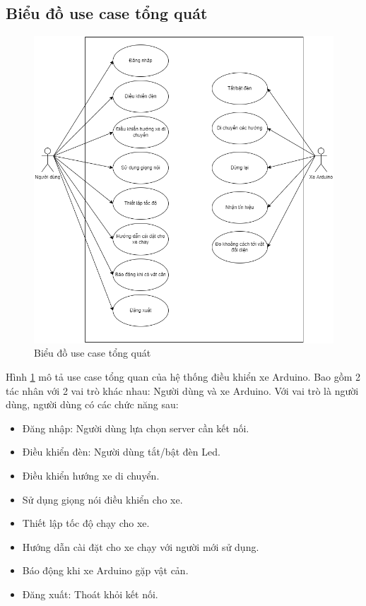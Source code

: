 \documentclass[../DoAn.tex]{subfiles}
\begin{document}
\subsection{Biểu đồ use case tổng quát}
\label{subsection:2.2.1}
\begin{figure}[H]
    \includegraphics[scale = 0.6]{Hinhve/usecase_tong_quan.png}
    \centering
    \caption{Biểu đồ use case tổng quát}
    \label{fig:2.2.1}
\end{figure}

Hình \ref{fig:2.2.1} mô tả use case tổng quan của hệ thống điều khiển xe Arduino. Bao gồm 2 tác nhân với 2 vai trò khác nhau: Người dùng và xe Arduino. Với vai trò là người dùng, người dùng có các chức năng sau:
\begin{itemize}
    \item Đăng nhập: Người dùng lựa chọn server cần kết nối.
    \item Điều khiển đèn: Người dùng tắt/bật đèn Led.
    \item Điều khiển hướng xe di chuyển.
    \item Sử dụng giọng nói điều khiển cho xe.
    \item Thiết lập tốc độ chạy cho xe.
    \item Hướng dẫn cài đặt cho xe chạy với người mới sử dụng.
    \item Báo động khi xe Arduino gặp vật cản.
    \item Đăng xuất: Thoát khỏi kết nối.
\end{itemize}
\end{document}
